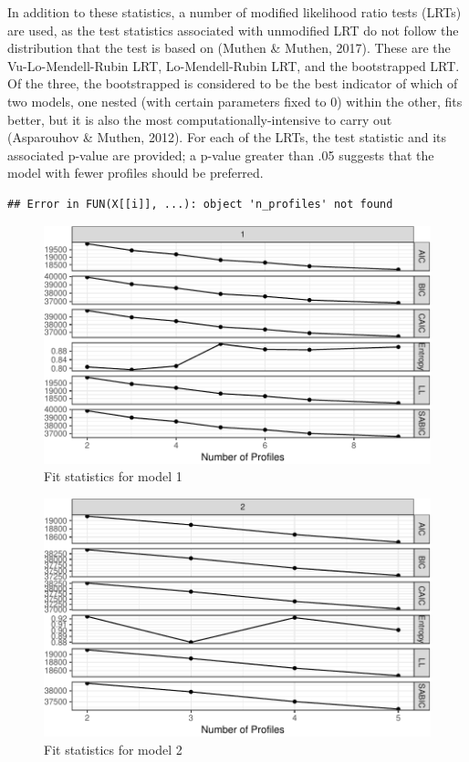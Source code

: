 \documentclass[]{msu-thesis}
\theoremstyle{definition}
\theoremstyle{definition}
\theoremstyle{definition}
\theoremstyle{remark}
\begin{document}
In addition to these statistics, a number of modified likelihood ratio
tests (LRTs) are used, as the test statistics associated with unmodified
LRT do not follow the distribution that the test is based on (Muthen \&
Muthen, 2017). These are the Vu-Lo-Mendell-Rubin LRT, Lo-Mendell-Rubin
LRT, and the bootstrapped LRT. Of the three, the bootstrapped is
considered to be the best indicator of which of two models, one nested
(with certain parameters fixed to 0) within the other, fits better, but
it is also the most computationally-intensive to carry out (Asparouhov
\& Muthen, 2012). For each of the LRTs, the test statistic and its
associated p-value are provided; a p-value greater than .05 suggests
that the model with fewer profiles should be preferred.

\begin{verbatim}
## Error in FUN(X[[i]], ...): object 'n_profiles' not found
\end{verbatim}

\begin{figure}

{\centering \includegraphics[width=0.8\linewidth]{rosenberg-dissertation_files/figure-latex/model1-1} 

}

\caption{Fit statistics for model 1}\label{fig:model1}
\end{figure}

\begin{figure}

{\centering \includegraphics[width=0.8\linewidth]{rosenberg-dissertation_files/figure-latex/model2-1} 

}

\caption{Fit statistics for model 2}\label{fig:model2}
\end{figure}
\end{document}
